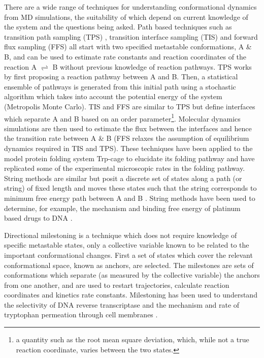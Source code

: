 There are a wide range of techniques for understanding conformational dynamics from MD simulations, the suitability of which depend on current knowledge of the system and the questions being asked. Path based techniques such as transition path sampling (TPS) \cite{bolhuisTRANSITIONPATHSAMPLING2002, dellagoTransitionPathSampling1998, dellagoTransitionPathSampling2002a}, transition interface sampling (TIS) \cite{vanerpNovelPathSampling2003} and forward flux sampling (FFS) 
\cite{allenSamplingRareSwitching2005} all start with two specified metastable conformations, A \& B, and can be used to estimate rate constants and reaction coordinates of the reaction A $\rightleftharpoons$ B without previous knowledge of reaction pathways. TPS works by first proposing a reaction pathway between A and B. Then, a statistical ensemble of pathways is generated from this initial path using a stochastic algorithm which takes into account the potential energy of the system (Metropolis Monte Carlo). TIS and FFS are similar to TPS but define interfaces which separate A and B based on an order parameter\footnote{a quantity such as the root mean square deviation, which, while not a true reaction coordinate, varies between the two states.}. Molecular dynamics simulations are then used to estimate the flux between the interfaces and hence the transition rate between A \& B (FFS relaxes the assumption of equilibrium dynamics required in TIS and TPS). These techniques have been applied \cite{juraszekSamplingMultipleFolding2006, juraszekRateConstantReaction2008,velez-vegaKineticsMechanismUnfolding2010} to the model protein folding system Trp-cage \cite{neidighDesigning20residueProtein2002} to elucidate its folding pathway and have replicated some of the experimental microscopic rates in the folding pathway. String methods are similar but posit a discrete set of states along a path (or string) of fixed length and moves these states such that the string corresponds to minimum free energy path between A and B \cite{weinane.TransitionPathTheoryPathFinding2010, jnssonNudgedElasticBand1998}. String methods have been used to determine, for example, the mechanism and binding free energy of platinum based drugs to DNA \cite{elderSequenceSpecificRecognitionCancer2012}. 

Directional milestoning \cite{faradjianComputingTimeScales2004, majekMilestoningReactionCoordinate2010,kirmizialtinRevisitingComputingReaction2011a} is a technique which does not require knowledge of specific metastable states, only a  collective variable known to be related to the important conformational changes.  First a set of states which cover the relevant conformational space, known as anchors, are selected. The milestones are sets of conformations which separate (as measured by the collective variable) the anchors from one another, and are used to restart trajectories, calculate reaction coordinates and kinetics rate constants. Milestoning has been used to understand the selectivity of DNA reverse transcriptase \cite{kirmizialtinHowConformationalDynamics2012} and the  mechanism and rate of tryptophan permeation through cell membranes \cite{cardenasUnassistedTransportAcetyl2012}.  

